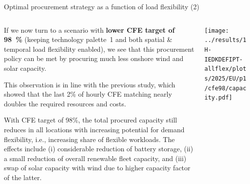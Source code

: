 \begin{frame}{Optimal procurement strategy as a function of load flexibility (2)}
  \label{cfe98portfolio}

  {\footnotesize
  \vspace{0.2cm}
  
  \begin{columns}[T]

  \begin{column}{6cm}
  If we now turn to a scenario with {\bf lower CFE target of 98~\%} (keeping technology palette~1 and both spatial \& temporal load flexibility enabled), we see that this procurement policy can be met by procuring much less onshore wind and solar capacity.
  
  \vspace{0.1cm}
  This observation is in line with the previous study, which showed that the last 2\% of hourly CFE matching nearly doubles the required resources and costs.  

  \vspace{0.1cm}
  With CFE target of 98\%, the total procured capacity still reduces in all locations with increasing potential for demand flexibility, i.e., increasing share of flexible workloads. The effects include (i) considerable reduction of battery storage, (ii) a small reduction of overall renewable fleet capacity, and (iii) swap of solar capacity with wind due to higher capacity factor of the latter. 
  
  \end{column}

  \begin{column}{9cm}
    \centering
    \texttt{[image: ../results/1H-IEDKDEFIPT-allflex/plots/2025/EU/p1/cfe98/capacity.pdf]}
  \end{column}
  \end{columns}
  }
  \end{frame}


